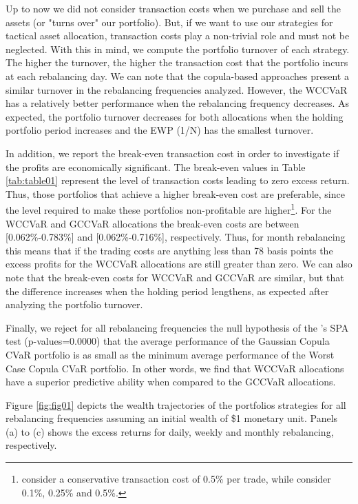 \documentclass[a4paper,12pt]{report}
\begin{document}
\begin{refsection}
Up to now we did not consider transaction costs when we purchase and sell
the assets (or "turns over" our portfolio). But, if we want to use our
strategies for tactical asset allocation, transaction costs play a
non-trivial role and must not be neglected. With this in mind, we compute
the portfolio turnover of each strategy. The higher the turnover, the higher
the transaction cost that the portfolio incurs at each rebalancing day. We can note that the copula-based approaches present a similar turnover in the rebalancing frequencies analyzed. However, the WCCVaR has a relatively better performance when the rebalancing frequency decreases. As expected, the portfolio turnover decreases for both allocations
when the holding portfolio period increases and the EWP (1/N) has the
smallest turnover.

In addition, we report the break-even transaction cost in order to investigate
if the profits are economically significant. The break-even values in Table
\ref{tab:table01} represent the level of transaction
costs leading to zero excess return. Thus, those portfolios that achieve a
higher break-even cost are preferable, since the level required to make
these portfolios non-profitable are higher\footnote{\citet*{jega1993} consider a conservative transaction cost of 0.5\% per
	trade, while \citet*{allen1999} consider 0.1\%, 0.25\% and 0.5\%.}. For the
WCCVaR and GCCVaR allocations the break-even costs are between [0.062\%-0.783\%]
and [0.062\%-0.716\%], respectively. Thus, for month rebalancing this means
that if the trading costs are anything less than 78 basis points the excess
profits for the WCCVaR allocations are still greater than zero. We can also note
that the break-even costs for WCCVaR and GCCVaR are similar, but that the
difference increases when the holding period lengthens, as expected after analyzing the portfolio turnover. 

Finally, we reject for all rebalancing frequencies the null hypothesis of the \citet*{hansen2005test}'s SPA test (p-values=0.0000) that the average performance of the Gaussian Copula CVaR 
portfolio is as small as the minimum average
performance of the Worst Case Copula CVaR portfolio. In other words, we find that WCCVaR allocations have a superior predictive ability when compared to the GCCVaR allocations.


Figure \ref{fig:fig01} depicts the wealth trajectories of the portfolios strategies for all rebalancing frequencies assuming an initial wealth of \$1 monetary unit. Panels (a) to (c) shows the excess returns for daily, weekly and monthly rebalancing, respectively.


\end{refsection}
\end{document}
